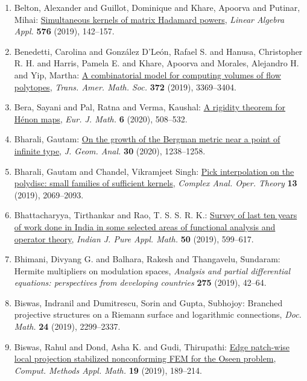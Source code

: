 \begin{enumerate}
{derivations}, \emph{Ann. Mat. Pura Appl. (4)} {\bf 198} (2019), 1781--1802.
\item Belton, Alexander and Guillot, Dominique and Khare, Apoorva
and Putinar, Mihai: \href{https://doi.org/10.1016/j.laa.2018.03.035}{Simultaneous kernels of matrix {H}adamard powers}, \emph{Linear Algebra Appl.} {\bf 576} (2019), 142--157.
\item Benedetti, Carolina and Gonz\'{a}lez D'Le\'{o}n, Rafael S. and Hanusa,
Christopher R. H. and Harris, Pamela E. and Khare, Apoorva and
Morales, Alejandro H. and Yip, Martha: \href{https://doi.org/10.1090/tran/7743}{A combinatorial model for computing volumes of flow polytopes}, \emph{Trans. Amer. Math. Soc.} {\bf 372} (2019), 3369--3404.
\item Bera, Sayani and Pal, Ratna and Verma, Kaushal: \href{https://doi.org/10.1007/s40879-019-00326-7}{A rigidity theorem for {H}\'{e}non maps}, \emph{Eur. J. Math.} {\bf 6} (2020), 508--532.
\item Bharali, Gautam: \href{https://doi.org/10.1007/s12220-019-00342-9}{On the growth of the {B}ergman metric near a point of infinite
type}, \emph{J. Geom. Anal.} {\bf 30} (2020), 1238--1258.
\item Bharali, Gautam and Chandel, Vikramjeet Singh: \href{https://doi.org/10.1007/s11785-017-0701-5}{Pick interpolation on the polydisc: small families of
sufficient kernels}, \emph{Complex Anal. Oper. Theory} {\bf 13} (2019), 2069--2093.
\item Bhattacharyya, Tirthankar and Rao, T. S. S. R. K.: \href{https://doi.org/10.1007/s13226-019-0345-4}{Survey of last ten years of work done in {I}ndia in some
selected areas of functional analysis and operator theory}, \emph{Indian J. Pure Appl. Math.} {\bf 50} (2019), 599--617.
\item Bhimani, Divyang G. and Balhara, Rakesh and Thangavelu,
Sundaram: Hermite multipliers on modulation spaces, \emph{Analysis and partial differential equations: perspectives from
developing countries} {\bf 275} (2019), 42--64.
\item Biswas, Indranil and Dumitrescu, Sorin and Gupta, Subhojoy: Branched projective structures on a {R}iemann surface and
logarithmic connections, \emph{Doc. Math.} {\bf 24} (2019), 2299--2337.
\item Biswas, Rahul and Dond, Asha K. and Gudi, Thirupathi: \href{https://doi.org/10.1515/cmam-2018-0020}{Edge patch-wise local projection stabilized nonconforming
{FEM} for the {O}seen problem}, \emph{Comput. Methods Appl. Math.} {\bf 19} (2019), 189--214.

\end{enumerate}
